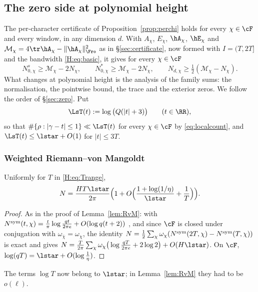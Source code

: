 \subsection{The zero side at polynomial height}\label{H:sec:zero}

The per-character certificate of Proposition~\ref{prop:perchi} holds for every $\chi\in\cF$ and every window, in any dimension $d$. With $A_\chi$, $E_\chi$, $\hA_\chi$, $\hE_\chi$ and $\mathcal M_\chi=4\tr\hA_\chi-\|\hA_\chi\|_\Fro^2$ as in \S\ref{sec:certificate}, now formed with $I=(T,2T]$ and the bandwidth \eqref{H:eq:basic}, it gives for every $\chi\in\cF$
\begin{equation}\label{H:eq:perchi}
N^s_{0,\chi}\ge\mathcal M_\chi-2N_\chi,\qquad N^*_{0,\chi}\ge\mathcal M_\chi-2N_\chi,\qquad N_{d,\chi}\ge\tfrac12(\mathcal M_\chi-N_\chi).
\end{equation}
What changes at polynomial height is the analysis of the family sums: the normalisation, the pointwise bound, the trace and the exterior zeros. We follow the order of \S\ref{sec:zero}. Put
\[
\LsT(t):=\log\big(Q(|t|+3)\big)\qquad(t\in\RR),
\]
so that $\#\{\rho:|\gamma-t|\le1\}\ll\LsT(t)$ for every $\chi\in\cF$ by \eqref{eq:localcount}, and $\LsT(t)\le\lstar+O(1)$ for $|t|\le3T$.

\subsubsection*{Weighted Riemann--von Mangoldt}
\begin{lemma}\label{H:lem:RvM}
Uniformly for $T$ in \eqref{H:eq:Trange},
\[
N=\frac{HT\lstar}{2\pi}\Big(1+O\Big(\frac{1+\log(1/\eta)}{\lstar}+\frac1T\Big)\Big).
\]
\end{lemma}
\begin{proof}
As in the proof of Lemma~\ref{lem:RvM}: with $N^{\rm sym}(t,\chi)=\frac t\pi\log\frac{qt}{2\pi e}+O(\log q(t+2))$ \cite[Ch.~16]{Dav}, and since $\cF$ is closed under conjugation with $\omega_{\overline\chi}=\omega_\chi$, the identity $N=\frac12\sum_\chi\omega_\chi(N^{\rm sym}(2T,\chi)-N^{\rm sym}(T,\chi))$ is exact and gives
$N=\frac T{2\pi}\sum_\chi\omega_\chi\big(\log\frac{qT}{2\pi e}+2\log2\big)+O(H\lstar)$. On $\cF$, $\log(qT)=\lstar+O(\log\frac1\eta)$.
\end{proof}
The terms $\log T$ now belong to $\lstar$; in Lemma~\ref{lem:RvM} they had to be $o(\ell)$.

